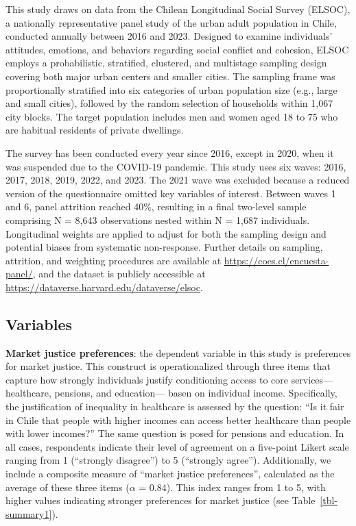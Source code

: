 \documentclass[
  12pt,
]{article}
\begin{document}
This study draws on data from the Chilean Longitudinal Social Survey
(ELSOC), a nationally representative panel study of the urban adult
population in Chile, conducted annually between 2016 and 2023. Designed
to examine individuals' attitudes, emotions, and behaviors regarding
social conflict and cohesion, ELSOC employs a probabilistic, stratified,
clustered, and multistage sampling design covering both major urban
centers and smaller cities. The sampling frame was proportionally
stratified into six categories of urban population size (e.g., large and
small cities), followed by the random selection of households within
1,067 city blocks. The target population includes men and women aged 18
to 75 who are habitual residents of private dwellings.

The survey has been conducted every year since 2016, except in 2020,
when it was suspended due to the COVID-19 pandemic. This study uses six
waves: 2016, 2017, 2018, 2019, 2022, and 2023. The 2021 wave was
excluded because a reduced version of the questionnaire omitted key
variables of interest. Between waves 1 and 6, panel attrition reached
40\%, resulting in a final two-level sample comprising N = 8,643
observations nested within N = 1,687 individuals. Longitudinal weights
are applied to adjust for both the sampling design and potential biases
from systematic non-response. Further details on sampling, attrition,
and weighting procedures are available at
\url{https://coes.cl/encuesta-panel/}, and the dataset is publicly
accessible at \url{https://dataverse.harvard.edu/dataverse/elsoc}.

\subsection{Variables}\label{variables}

\textbf{Market justice preferences}: the dependent variable in this
study is preferences for market justice. This construct is
operationalized through three items that capture how strongly
individuals justify conditioning access to core services---healthcare,
pensions, and education--- basen on individual income. Specifically, the
justification of inequality in healthcare is assessed by the question:
``Is it fair in Chile that people with higher incomes can access better
healthcare than people with lower incomes?'' The same question is posed
for pensions and education. In all cases, respondents indicate their
level of agreement on a five-point Likert scale ranging from 1
(``strongly disagree'') to 5 (``strongly agree''). Additionally, we
include a composite measure of ``market justice preferences'',
calculated as the average of these three items (\(\alpha\) = 0.84). This
index ranges from 1 to 5, with higher values indicating stronger
preferences for market justice (see Table~\ref{tbl-summary1}).
\end{document}

